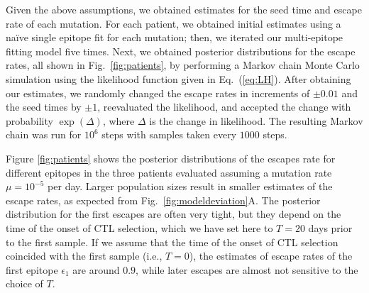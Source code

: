 \documentclass{frontiers}
\newcommand{\EQ}[1]{Eq.~(\ref{eq:#1})}
\newcommand{\FIG}[1]{Fig.~\ref{fig:#1}}
\newcommand{\fcoeff}{\epsilon}
\begin{document}
Given the above assumptions, we obtained estimates for the seed time and escape rate 
of each mutation. For each patient, we obtained initial estimates using a 
na\"ive single epitope fit for each mutation; then, we iterated
our multi-epitope fitting model five times. Next, we obtained posterior
distributions for the escape rates, all shown in \FIG{patients}, by performing a Markov chain Monte
Carlo simulation using the likelihood function given in \EQ{LH}. After obtaining our 
estimates, we randomly changed the escape rates in
increments of $\pm 0.01$ and the seed times by $\pm 1$, reevaluated the
likelihood, and accepted the change with probability $\exp(\Delta)$, where
$\Delta$ is the change in likelihood. The resulting Markov chain was run for
$10^6$ steps with samples taken every $1000$ steps.


Figure \ref{fig:patients} shows the posterior distributions of the escapes rate for
different epitopes in the three patients evaluated assuming a mutation
rate $\mu=10^{-5}$ per day. Larger
population sizes result in smaller estimates of the escape rates, as expected 
from \FIG{modeldeviation}A. 
The posterior distribution for the first escapes are often very tight,
but they depend on the time of the onset of CTL selection, which we have
set here to $T=20$ days prior to the first sample. If we assume that the
time of the onset of CTL selection coincided with the first sample (i.e., $T=0$), the
estimates of escape rates of the first epitope $\fcoeff_1$ are around
$0.9$, while later escapes are almost not sensitive to the choice of $T$.
\end{document}
